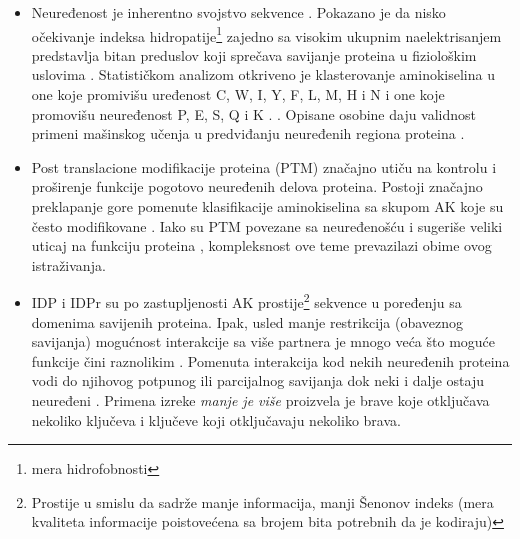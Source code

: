 \begin{itemize}

  \item
    Neuređenost je inherentno svojstvo sekvence \parencite{dunker2001}.
    Pokazano je da nisko očekivanje indeksa hidropatije\footnote{mera hidrofobnosti} zajedno sa visokim
    ukupnim naelektrisanjem predstavlja bitan preduslov koji sprečava savijanje
    proteina u fiziološkim uslovima \parencite{uversky2016}. Statističkom
    analizom otkriveno je klasterovanje aminokiselina u one koje promivišu
    uređenost C, W, I, Y, F, L, M, H i N  i one koje
    promovišu neuređenost P, E, S, Q i K .
    \parencite{oldfield2014, uversky2016}. Opisane osobine daju validnost
    primeni mašinskog učenja u predviđanju neuređenih regiona proteina
    \parencite{oldfield2014}.

  \item
    Post translacione modifikacije proteina (PTM) značajno utiču na  kontrolu i
    proširenje funkcije pogotovo neuređenih delova proteina. Postoji značajno
    preklapanje gore pomenute klasifikacije aminokiselina sa skupom AK koje su
    često modifikovane \parencite{uversky2016}. Iako su PTM povezane sa
    neuređenošću i sugeriše veliki uticaj na funkciju proteina
    \parencite{uversky2016}, kompleksnost ove teme prevazilazi obime ovog
    istraživanja.


  \item
    IDP i IDPr su po zastupljenosti AK prostije\footnote{ Prostije u smislu da
      sadrže manje informacija, manji  Šenonov indeks (mera kvaliteta
    informacije poistovećena sa brojem bita potrebnih da je kodiraju) }
    sekvence u poređenju sa domenima savijenih proteina. Ipak, usled manje
    restrikcija (obaveznog savijanja) mogućnost interakcije sa više partnera je
    mnogo veća što moguće funkcije čini raznolikim \parencite{uversky2016}.
    Pomenuta interakcija kod nekih neuređenih proteina vodi do njihovog
    potpunog ili parcijalnog savijanja dok neki i dalje ostaju neuređeni
    \parencite{uversky2016}.  Primena izreke \textit{manje je više} proizvela
    je brave koje otključava nekoliko ključeva i ključeve koji otključavaju
    nekoliko brava.


\end{itemize}
